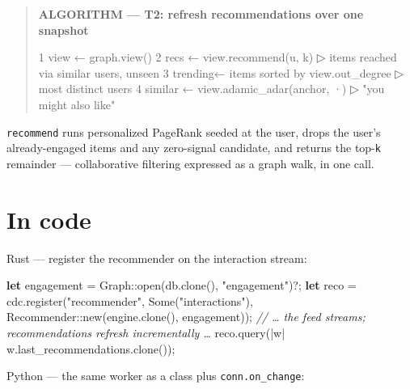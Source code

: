 \documentclass[
  11pt,
  openany]{book}
\newenvironment{Shaded}{}{}
\newcommand{\CommentTok}[1]{\textcolor[rgb]{0.38,0.63,0.69}{\textit{#1}}}
\newcommand{\ConstantTok}[1]{\textcolor[rgb]{0.53,0.00,0.00}{#1}}
\newcommand{\KeywordTok}[1]{\textcolor[rgb]{0.00,0.44,0.13}{\textbf{#1}}}
\newcommand{\NormalTok}[1]{#1}
\newcommand{\OperatorTok}[1]{\textcolor[rgb]{0.40,0.40,0.40}{#1}}
\newcommand{\PreprocessorTok}[1]{\textcolor[rgb]{0.74,0.48,0.00}{#1}}
\newcommand{\StringTok}[1]{\textcolor[rgb]{0.25,0.44,0.63}{#1}}
\begin{document}
\begin{quote}
\textbf{ALGORITHM --- T2: refresh recommendations over one snapshot}

\begin{Shaded}
\begin{Highlighting}[]
\NormalTok{1  view ← graph.view()}
\NormalTok{2  recs    ← view.recommend(u, k)            ▷ items reached via similar users, unseen}
\NormalTok{3  trending← items sorted by view.out\_degree ▷ most distinct users}
\NormalTok{4  similar ← view.adamic\_adar(anchor, ·)     ▷ "you might also like"}
\end{Highlighting}
\end{Shaded}
\end{quote}

\texttt{recommend} runs personalized PageRank seeded at the user, drops
the user's already-engaged items and any zero-signal candidate, and
returns the top-\texttt{k} remainder --- collaborative filtering
expressed as a graph walk, in one call.

\section{In code}\label{in-code}

Rust --- register the recommender on the interaction stream:

\begin{Shaded}
\begin{Highlighting}[]
\KeywordTok{let}\NormalTok{ engagement }\OperatorTok{=} \PreprocessorTok{Graph::}\NormalTok{open(db}\OperatorTok{.}\NormalTok{clone()}\OperatorTok{,} \StringTok{"engagement"}\NormalTok{)}\OperatorTok{?;}
\KeywordTok{let}\NormalTok{ reco }\OperatorTok{=}\NormalTok{ cdc}\OperatorTok{.}\NormalTok{register(}\StringTok{"recommender"}\OperatorTok{,} \ConstantTok{Some}\NormalTok{(}\StringTok{"interactions"}\NormalTok{)}\OperatorTok{,}
                        \PreprocessorTok{Recommender::}\NormalTok{new(engine}\OperatorTok{.}\NormalTok{clone()}\OperatorTok{,}\NormalTok{ engagement))}\OperatorTok{;}
\CommentTok{// … the feed streams; recommendations refresh incrementally …}
\NormalTok{reco}\OperatorTok{.}\NormalTok{query(}\OperatorTok{|}\NormalTok{w}\OperatorTok{|}\NormalTok{ w}\OperatorTok{.}\NormalTok{last\_recommendations}\OperatorTok{.}\NormalTok{clone())}\OperatorTok{;}
\end{Highlighting}
\end{Shaded}

Python --- the same worker as a class plus \texttt{conn.on\_change}:
\end{document}
